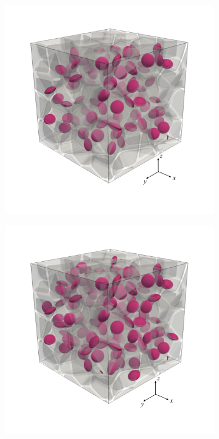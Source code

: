 \begin{figure}[!htbp]
\begin{subfigure}{0.32\textwidth}
    \includegraphics[width=\textwidth]{Chapter3/figures/b100_ini_new}
    \caption{}
    \label{b100_ini}
  \end{subfigure}
  \begin{subfigure}{0.32\textwidth}
    \centering
    \includegraphics[width=\textwidth]{Chapter3/figures/b150_ini_new}

\end{subfigure}
\end{figure}
